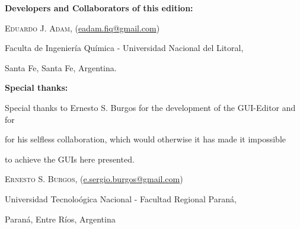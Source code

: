 
\textbf{Developers and Collaborators of this edition:}

\vspace{0.4cm}
\textsc{Eduardo J. Adam}, (\url{eadam.fiq@gmail.com})

Faculta de Ingeniería Química - Universidad Nacional del Litoral,

Santa Fe, Santa Fe, Argentina.


\vspace{2cm}
\textbf{Special thanks:}

\vspace{0.4cm}
Special thanks to Ernesto S. Burgos for the development of the GUI-Editor and for

for his selfless collaboration, which would otherwise it has made it impossible 

to achieve the GUIs here presented.

\vspace{0.2cm}
\textsc{Ernesto S. Burgos}, (\url{e.sergio.burgos@gmail.com})

Universidad Tecnoloógica Nacional - Facultad Regional Paraná,

Paraná, Entre Ríos, Argentina

